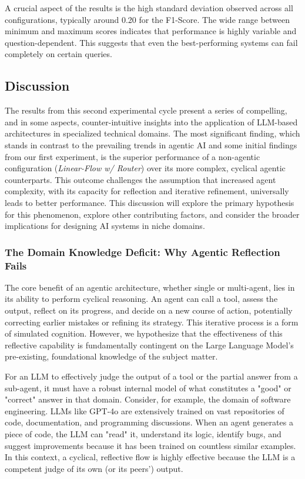         A crucial aspect of the results is the high standard deviation observed across all configurations, typically around 0.20 for the F1-Score. The wide range between minimum and maximum scores indicates that performance is highly variable and question-dependent. This suggests that even the best-performing systems can fail completely on certain queries.



    \subsection{Discussion} \label{sec:exp2-discussion}

        The results from this second experimental cycle present a series of compelling, and in some aspects, counter-intuitive insights into the application of LLM-based architectures in specialized technical domains. The most significant finding, which stands in contrast to the prevailing trends in agentic AI and some initial findings from our first experiment, is the superior performance of a non-agentic configuration (\textit{Linear-Flow w/ Router}) over its more complex, cyclical agentic counterparts. This outcome challenges the assumption that increased agent complexity, with its capacity for reflection and iterative refinement, universally leads to better performance. This discussion will explore the primary hypothesis for this phenomenon, explore other contributing factors, and consider the broader implications for designing AI systems in niche domains.

        \subsubsection{The Domain Knowledge Deficit: Why Agentic Reflection Fails}

            The core benefit of an agentic architecture, whether single or multi-agent, lies in its ability to perform cyclical reasoning. An agent can call a tool, assess the output, reflect on its progress, and decide on a new course of action, potentially correcting earlier mistakes or refining its strategy. This iterative process is a form of simulated cognition. However, we hypothesize that the effectiveness of this reflective capability is fundamentally contingent on the Large Language Model's pre-existing, foundational knowledge of the subject matter.
            
            For an LLM to effectively judge the output of a tool or the partial answer from a sub-agent, it must have a robust internal model of what constitutes a "good" or "correct" answer in that domain. Consider, for example, the domain of software engineering. LLMs like GPT-4o are extensively trained on vast repositories of code, documentation, and programming discussions. When an agent generates a piece of code, the LLM can "read" it, understand its logic, identify bugs, and suggest improvements because it has been trained on countless similar examples. In this context, a cyclical, reflective flow is highly effective because the LLM is a competent judge of its own (or its peers') output.
            
